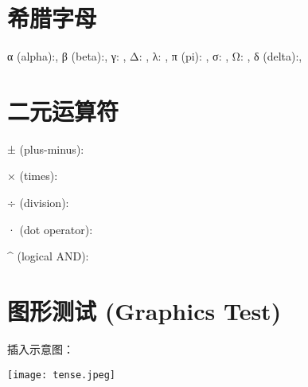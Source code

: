 \documentclass[a4paper,12pt]{article}
\begin{document}
    \section*{希腊字母}
    α (alpha):\alpha, \;
    β (beta):\beta, \;
    γ: \gamma, \;
    Δ: \Delta, \;
    λ: \lambda, \;
    π (pi): \pi, \;
    σ: \sigma, \;
    Ω: \Omega, \;
    δ (delta):\delta, \;


    \section*{二元运算符}
    ± (plus-minus):\pm

    × (times):\times

    ÷ (division):\div

    · (dot operator):\dot

    ^ (logical AND):\wedge

    \section*{图形测试 (Graphics Test)}
    插入示意图：

    \texttt{[image: tense.jpeg]}
\end{document}
